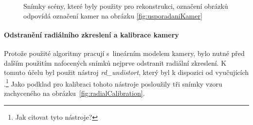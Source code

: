 \documentclass[11pt,oneside,a4paper,pdftex]{article}   %
\begin{document}
\begin{figure}[htbp]
{				\fbox{\begin{minipage}{3cm}\hfill\vspace{4cm}\end{minipage}}
			}
		\caption{Snímky scény, které byly použity pro rekonstrukci, označení obrázků
			odpovídá označení kamer na obrázku \ref{fig:usporadaniKamer}}
		\label{fig:fotografie}
	\end{figure}

\paragraph{Odstranění radiálního zkreslení a kalibrace kamery} Protože použité algoritmy pracují
s~lineárním modelem kamery, bylo nutné před dalším použitím nafocených snímků nejprve odstranit
radiální zkreslení. K tomuto účelu byl použit nástroj \emph{rd\_undistort}, který byl k dispozici od
vyučujících \cite{code_repo}.\footnote{Jak citovat tyto nástroje?} Jako podklad pro kalibraci tohoto
nástroje posloužily tři snímky vzoru zachyceného na obrázku~\ref{fig:radialCalibration}.

\def\IAC{\boldsymbol \omega}
\end{document}
